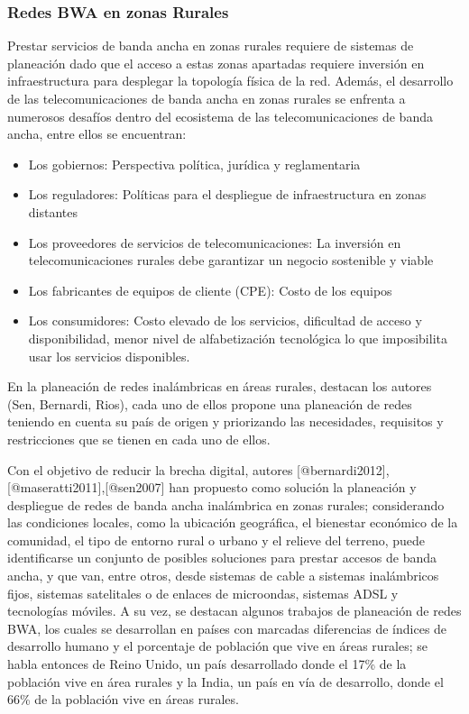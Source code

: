 \documentclass[]{article}
\begin{document}
\subsubsection{Redes BWA en zonas
Rurales}\label{redes-bwa-en-zonas-rurales}

Prestar servicios de banda ancha en zonas rurales requiere de sistemas
de planeación dado que el acceso a estas zonas apartadas requiere
inversión en infraestructura para desplegar la topología física de la
red. Además, el desarrollo de las telecomunicaciones de banda ancha en
zonas rurales se enfrenta a numerosos desafíos dentro del ecosistema de
las telecomunicaciones de banda ancha, entre ellos se encuentran:

\begin{itemize}
\item
  Los gobiernos: Perspectiva política, jurídica y reglamentaria
\item
  Los reguladores: Políticas para el despliegue de infraestructura en
  zonas distantes
\item
  Los proveedores de servicios de telecomunicaciones: La inversión en
  telecomunicaciones rurales debe garantizar un negocio sostenible y
  viable
\item
  Los fabricantes de equipos de cliente (CPE): Costo de los equipos
\item
  Los consumidores: Costo elevado de los servicios, dificultad de acceso
  y disponibilidad, menor nivel de alfabetización tecnológica lo que
  imposibilita usar los servicios disponibles.
\end{itemize}

En la planeación de redes inalámbricas en áreas rurales, destacan los
autores (Sen, Bernardi, Rios), cada uno de ellos propone una planeación
de redes teniendo en cuenta su país de origen y priorizando las
necesidades, requisitos y restricciones que se tienen en cada uno de
ellos.

Con el objetivo de reducir la brecha digital, autores
{[}@bernardi2012{]},{[}@maseratti2011{]},{[}@sen2007{]} han propuesto
como solución la planeación y despliegue de redes de banda ancha
inalámbrica en zonas rurales; considerando las condiciones locales, como
la ubicación geográfica, el bienestar económico de la comunidad, el tipo
de entorno rural o urbano y el relieve del terreno, puede identificarse
un conjunto de posibles soluciones para prestar accesos de banda ancha,
y que van, entre otros, desde sistemas de cable a sistemas inalámbricos
fijos, sistemas satelitales o de enlaces de microondas, sistemas ADSL y
tecnologías móviles. A su vez, se destacan algunos trabajos de
planeación de redes BWA, los cuales se desarrollan en países con
marcadas diferencias de índices de desarrollo humano y el porcentaje de
población que vive en áreas rurales; se habla entonces de Reino Unido,
un país desarrollado donde el 17\% de la población vive en área rurales
y la India, un país en vía de desarrollo, donde el 66\% de la población
vive en áreas rurales.
\end{document}
